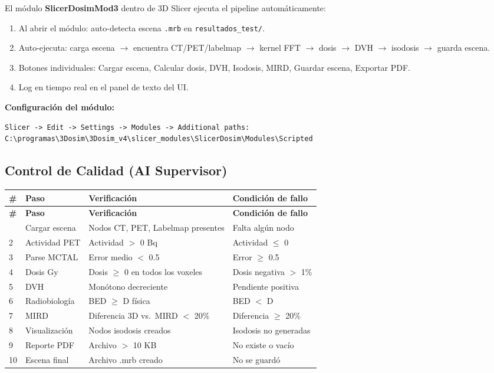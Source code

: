 \documentclass[12pt,a4paper]{article}
\begin{document}
El módulo \textbf{SlicerDosimMod3} dentro de 3D Slicer ejecuta el pipeline automáticamente:

\begin{enumerate}
  \item Al abrir el módulo: auto-detecta escena \texttt{.mrb} en \texttt{resultados\_test/}.
  \item Auto-ejecuta: carga escena $\to$ encuentra CT/PET/labelmap $\to$ kernel FFT $\to$ dosis $\to$ DVH $\to$ isodosis $\to$ guarda escena.
  \item Botones individuales: Cargar escena, Calcular dosis, DVH, Isodosis, MIRD, Guardar escena, Exportar PDF.
  \item Log en tiempo real en el panel de texto del UI.
\end{enumerate}

\textbf{Configuración del módulo:}
\begin{verbatim}
Slicer -> Edit -> Settings -> Modules -> Additional paths:
C:\programas\3Dosim\3Dosim_v4\slicer_modules\SlicerDosim\Modules\Scripted
\end{verbatim}

\subsection*{Control de Calidad (AI Supervisor)}

\begin{longtable}{p{0.5cm} p{4cm} p{4.5cm} p{5cm}}
\toprule
\textbf{\#} & \textbf{Paso} & \textbf{Verificación} & \textbf{Condición de fallo} \\
\midrule
\endfirsthead
\toprule
\textbf{\#} & \textbf{Paso} & \textbf{Verificación} & \textbf{Condición de fallo} \\
\midrule
\endhead
\bottomrule
\endfoot
1 & Cargar escena & Nodos CT, PET, Labelmap presentes & Falta algún nodo \\
2 & Actividad PET & Actividad $>$ 0 Bq & Actividad $\leq$ 0 \\
3 & Parse MCTAL & Error medio $<$ 0.5 & Error $\geq$ 0.5 \\
4 & Dosis Gy & Dosis $\geq$ 0 en todos los voxeles & Dosis negativa $>$ 1\% \\
5 & DVH & Monótono decreciente & Pendiente positiva \\
6 & Radiobiología & BED $\geq$ D física & BED $<$ D \\
7 & MIRD & Diferencia 3D vs.\ MIRD $<$ 20\% & Diferencia $\geq$ 20\% \\
8 & Visualización & Nodos isodosis creados & Isodosis no generadas \\
9 & Reporte PDF & Archivo $>$ 10 KB & No existe o vacío \\
10 & Escena final & Archivo .mrb creado & No se guardó \\
\end{longtable}
\end{document}
